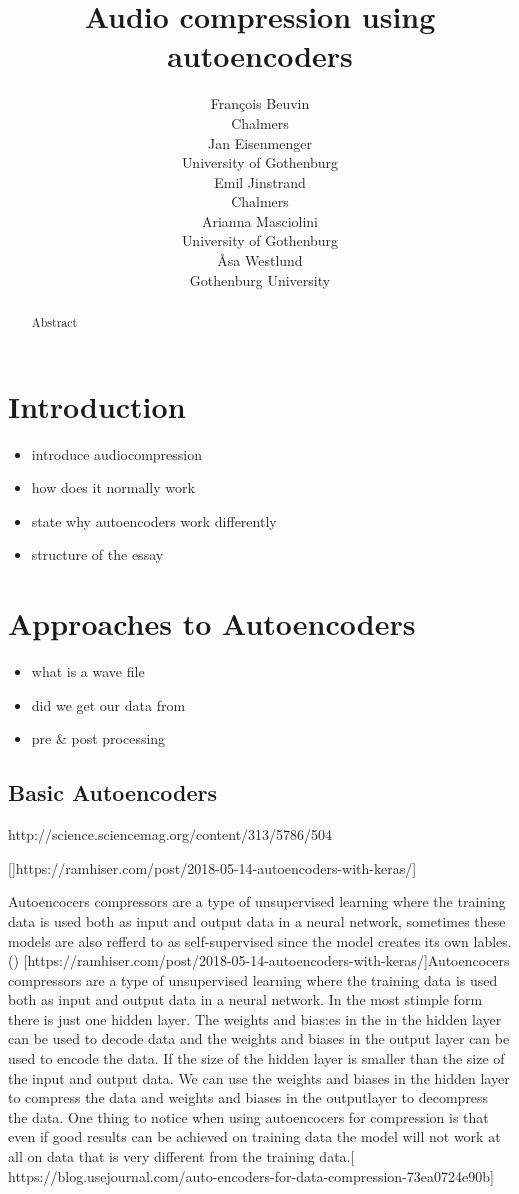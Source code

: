 \documentclass[11pt]{article}
\title{Audio compression using autoencoders}
\author{Fran\c{c}ois Beuvin \\
  Chalmers \\
  \And
  Jan Eisenmenger \\
  University of Gothenburg \\
  \And
  Emil Jinstrand \\
  Chalmers \\
  \AND
  Arianna Masciolini \\
  University of Gothenburg\\
  \And
  \r{A}sa Westlund \\
  Gothenburg University\\}
\date{}
\begin{document}
\maketitle
\begin{abstract}
Abstract
\end{abstract}

\nocite{*}



\section{Introduction}
\begin{itemize}
    \item introduce audiocompression
    \item how does it normally work
    \item state why autoencoders work differently
    \item structure of the essay
\end{itemize}

\section{Approaches to Autoencoders}
\begin{itemize}
    \item what is a wave file
    \item did we get our data from
    \item pre \& post processing
\end{itemize}
    	
   
\subsection{Basic Autoencoders}
http://science.sciencemag.org/content/313/5786/504

[]https://ramhiser.com/post/2018-05-14-autoencoders-with-keras/]

Autoencocers compressors are a type of unsupervised learning where the training data is used both as input and output data in a neural network, sometimes these models are also refferd to as self-supervised since the model creates its own lables. (\cite{Hinton.2006}) [https://ramhiser.com/post/2018-05-14-autoencoders-with-keras/]Autoencocers compressors are a type of unsupervised learning where the training data is used both as input and output data in a neural network. In the most stimple form there is just one hidden layer. The weights and bias:es in the in the hidden layer can be used to decode data and the weights and biases in the output layer can be used to encode the data. If the size of the hidden layer is smaller than the size of the input and output data. We can use the weights and biases in the hidden layer to compress the data and weights and biases in the outputlayer to decompress the data. 
One thing to notice when using autoencocers for compression is that even if good results can be achieved on training data the model will not work at all on data that is very different from the training data.[ https://blog.usejournal.com/auto-encoders-for-data-compression-73ea0724e90b] 
\end{document}
